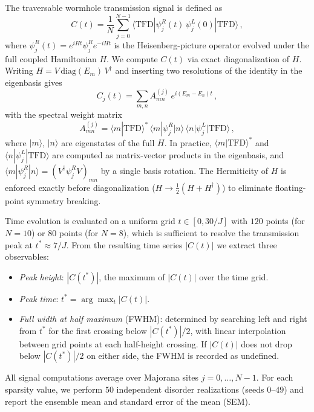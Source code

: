 \documentclass[aps,prd,twocolumn,superscriptaddress,nofootinbib,floatfix]{revtex4-2}
\newcommand{\bra}[1]{\langle #1 |}
\newcommand{\ket}[1]{| #1 \rangle}
\newcommand{\braket}[2]{\langle #1 | #2 \rangle}
\newcommand{\tfd}{\mathrm{TFD}}
\begin{document}
The traversable wormhole transmission signal is defined as
\begin{equation}
  C(t) = \frac{1}{N}\sum_{j=0}^{N-1}
    \bra{\tfd} \psi_j^R(t)\, \psi_j^L(0) \ket{\tfd}\,,
  \label{eq:signal}
\end{equation}
where $\psi_j^R(t) = e^{iHt}\psi_j^R e^{-iHt}$ is the Heisenberg-picture
operator evolved under the full coupled Hamiltonian $H$. We compute $C(t)$
via exact diagonalization of $H$. Writing $H = V\,\mathrm{diag}(E_m)\,V^\dagger$
and inserting two resolutions of the identity in the eigenbasis gives
\begin{equation}
  C_j(t) = \sum_{m,n} A_{mn}^{(j)}\, e^{i(E_m - E_n)t}\,,
  \label{eq:eigen_signal}
\end{equation}
with the spectral weight matrix
\begin{equation}
  A_{mn}^{(j)} = \braket{m}{\tfd}^*\,
    \bra{m}\psi_j^R\ket{n}\,
    \bra{n}\psi_j^L\ket{\tfd}\,,
  \label{eq:Amn}
\end{equation}
where $\ket{m}$, $\ket{n}$ are eigenstates of the full $H$. In practice,
$\braket{m}{\tfd}^*$ and $\braket{n}{\psi_j^L|\tfd}$ are computed as
matrix-vector products in the eigenbasis, and
$\bra{m}\psi_j^R\ket{n} = (V^\dagger \psi_j^R V)_{mn}$ by a single basis
rotation. The Hermiticity of $H$ is enforced exactly before diagonalization
($H \to \tfrac{1}{2}(H + H^\dagger)$) to eliminate floating-point symmetry
breaking.

Time evolution is evaluated on a uniform grid $t \in [0, 30/J]$ with
$120$ points (for $N=10$) or $80$ points (for $N=8$), which is sufficient
to resolve the transmission peak at $t^* \approx 7/J$. From the resulting
time series $|C(t)|$ we extract three observables:
\begin{itemize}
\item \emph{Peak height}: $|C(t^*)|$, the maximum of $|C(t)|$ over the
  time grid.
\item \emph{Peak time}: $t^* = \arg\max_t |C(t)|$.
\item \emph{Full width at half maximum} (FWHM): determined by searching
  left and right from $t^*$ for the first crossing below $|C(t^*)|/2$,
  with linear interpolation between grid points at each half-height
  crossing. If $|C(t)|$ does not drop below $|C(t^*)|/2$ on either side,
  the FWHM is recorded as undefined.
\end{itemize}
All signal computations average over Majorana sites $j = 0, \ldots, N-1$.
For each sparsity value, we perform $50$ independent disorder realizations
(seeds $0$--$49$) and report the ensemble mean and standard error of the
mean (SEM).
\end{document}
